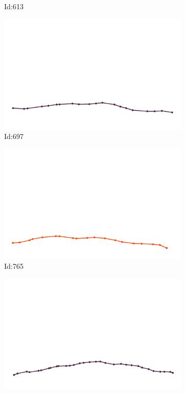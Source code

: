 \documentclass[12pt,twoside]{report}
\begin{document}
\begin{figure}
\begin{subfigure}[b]{0.20\textwidth}
\caption{Id:613}
\end{subfigure}
\begin{subfigure}[b]{0.20\textwidth}
\centering
\includegraphics[width=\textwidth]{../../trajectories/697.png}
\caption{Id:697}
\end{subfigure}
\begin{subfigure}[b]{0.20\textwidth}
\centering
\includegraphics[width=\textwidth]{../../trajectories/765.png}
\caption{Id:765}
\end{subfigure}
\begin{subfigure}[b]{0.20\textwidth}
\centering
\includegraphics[width=\textwidth]{../../trajectories/788.png}

\end{subfigure}
\end{figure}
\end{document}
